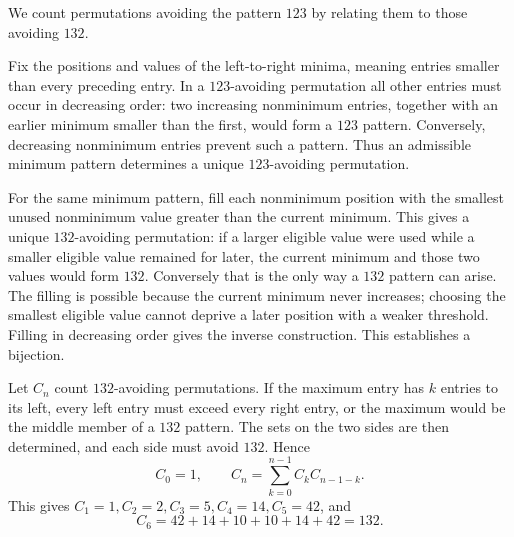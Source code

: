 We count permutations avoiding the pattern $123$ by relating them to those avoiding $132$.

Fix the positions and values of the left-to-right minima, meaning entries smaller than every preceding entry. In a $123$-avoiding permutation all other entries must occur in decreasing order: two increasing nonminimum entries, together with an earlier minimum smaller than the first, would form a $123$ pattern. Conversely, decreasing nonminimum entries prevent such a pattern. Thus an admissible minimum pattern determines a unique $123$-avoiding permutation.

For the same minimum pattern, fill each nonminimum position with the smallest unused nonminimum value greater than the current minimum. This gives a unique $132$-avoiding permutation: if a larger eligible value were used while a smaller eligible value remained for later, the current minimum and those two values would form $132$. Conversely that is the only way a $132$ pattern can arise. The filling is possible because the current minimum never increases; choosing the smallest eligible value cannot deprive a later position with a weaker threshold. Filling in decreasing order gives the inverse construction. This establishes a bijection.

Let $C_n$ count $132$-avoiding permutations. If the maximum entry has $k$ entries to its left, every left entry must exceed every right entry, or the maximum would be the middle member of a $132$ pattern. The sets on the two sides are then determined, and each side must avoid $132$. Hence
\[
C_0=1,\qquad C_n=\sum_{k=0}^{n-1}C_kC_{n-1-k}.
\]
This gives $C_1=1,C_2=2,C_3=5,C_4=14,C_5=42$, and
\[
C_6=42+14+10+10+14+42=\boxed{132}.
\]
